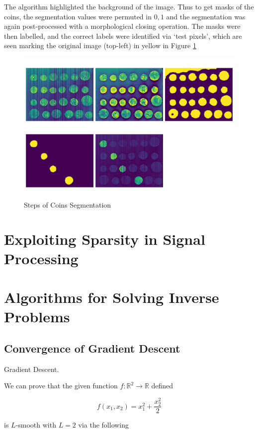 \documentclass[12pt]{article}
\begin{document}
The algorithm highlighted the background of the image.
Thus to get masks of the coins, the segmentation values were permuted in ${0,1}$ and the segmentation was again post-processed with a morphological closing operation.
The masks were then labelled, and the correct labels were identified via `test pixels', which are seen marking the original image (top-left) in yellow in Figure \ref{fig:coins}

\begin{figure}[hp]
    \includegraphics[scale=0.35]{figures/coins_segmentation.png}
    \caption{Steps of Coins Segmentation}
    \label{fig:coins}
\end{figure}

\section{Exploiting Sparsity in Signal Processing}



\section{Algorithms for Solving Inverse Problems}
\subsection{Convergence of Gradient Descent}

Gradient Descent.

We can prove that the given function $f:\mathbb{R}^2\rightarrow\mathbb{R}$ defined

\[f(x_1,x_2) = x_1^2 + \frac{x_2^2}{2}\]

is $L$-smooth with $L=2$ via the following
\end{document}
